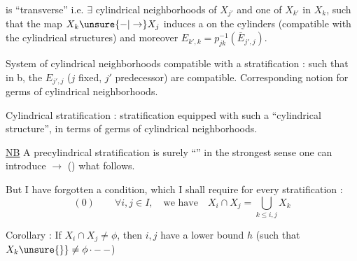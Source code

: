 is ``transverse'' i.e.  $\exists$ cylindrical neighborhoods
of $X_{j'}$  and one of $X_{k'}$ in $X_k$, such that the map
$X_k\unsure{-|\to}X_j$ induces a  on the
cylinders (compatible with the cylindrical
structures) and moreover
$E_{k',k}=p_{jk}^{-1}(\overline E_{j',j})$.

System of cylindrical neighborhoods 
compatible with a stratification : such that
in b, the $E_{j',j}$ ($j$ fixed, $j'$ predecessor)
are compatible. Corresponding notion
for germs of cylindrical neighborhoods.

Cylindrical stratification : stratification equipped
with such a ``cylindrical structure'', in
terms of germs of cylindrical neighborhoods.

\uline{NB} A precylindrical  stratification
is surely
``'' in the strongest sense one
can introduce $\to$ () what follows.

But I have forgotten a condition, which I shall require
for every stratification :
\[
(0)\qquad \forall i,j\in I,\quad\text{we have}\quad
X_i\cap X_j=\bigcup_{k\le i,j}X_k
\]

Corollary : If $X_i\cap X_j\ne\phi$, then $i,j$ have a
lower bound $h$ (such that  $X_k\unsure{\}}\ne\phi$\(\mathinner{\cdotp-\, -}\))
